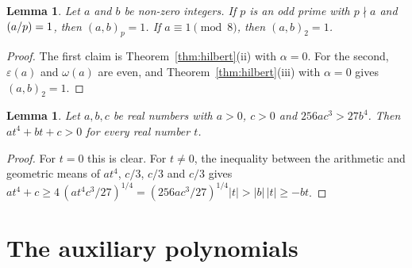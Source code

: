 \documentclass[11pt]{article}
\newtheorem{lemma}[theorem]{Lemma}
\newcommand{\leg}[2]{\mathchoice{\biggl(\dfrac{#1}{#2}\biggr)}{(#1/#2)}{(#1/#2)}{(#1/#2)}}
\begin{document}
\begin{lemma}\label{lem:square}
Let $a$ and $b$ be non-zero integers. If $p$ is an odd prime with $p\nmid a$ and $\leg{a}{p}=1$, then $(a,b)_p=1$. If $a\equiv1\pmod8$, then $(a,b)_2=1$.
\end{lemma}

\begin{proof}
The first claim is Theorem~\ref{thm:hilbert}(ii) with $\alpha=0$. For the second, $\varepsilon(a)$ and $\omega(a)$ are even, and Theorem~\ref{thm:hilbert}(iii) with $\alpha=0$ gives $(a,b)_2=1$.
\end{proof}


\begin{lemma}\label{lem:amgm}
Let $a,b,c$ be real numbers with $a>0$, $c>0$ and $256ac^3>27b^4$. Then $at^4+bt+c>0$ for every real number $t$.
\end{lemma}

\begin{proof}
For $t=0$ this is clear. For $t\neq0$, the inequality between the arithmetic and geometric means of $at^4$, $c/3$, $c/3$ and $c/3$ gives $at^4+c\geq4\,(at^4c^3/27)^{1/4}=(256ac^3/27)^{1/4}|t|>|b|\,|t|\geq-bt$.
\end{proof}

\section{The auxiliary polynomials}
\end{document}
